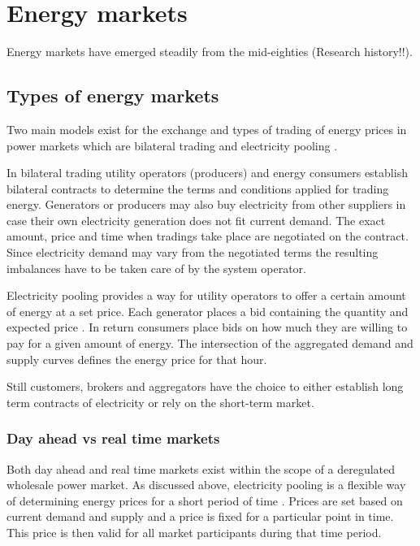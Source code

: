 

\section{Energy markets}

Energy markets have emerged steadily from the mid-eighties (Research history!!). 






\subsection{Types of energy markets}

Two main models exist for the exchange and types of trading of energy prices in power markets which are bilateral trading and electricity pooling \cite{onaiwu2009does,hogan1997reshaping,barroso2005classification}.

In bilateral trading utility operators (producers) and energy consumers establish bilateral contracts to determine the terms and conditions applied for trading energy. Generators or producers may also buy electricity from other suppliers in case their own electricity generation does not fit current demand. The exact amount, price and time when tradings take place are negotiated on the contract. Since electricity demand may vary from the negotiated terms the resulting imbalances have to be taken care of by the system operator. 

Electricity pooling provides a way for utility operators to offer a certain amount of energy at a set price. Each generator places a bid containing the quantity and expected price \cite{barroso2005classification}. In return consumers place bids on how much they are willing to pay for a given amount of energy. The intersection of the aggregated demand and supply curves defines the energy price for that hour. 

Still customers, brokers and aggregators have the choice to either establish long term contracts of electricity or rely on the short-term market. \cite{hogan1997reshaping}


\subsubsection{Day ahead vs real time markets}

Both day ahead and real time markets exist within the scope of a deregulated wholesale power market. As discussed above, electricity pooling is a flexible way of determining energy prices for a short period of time \cite{hogan1997reshaping}. Prices are set based on current demand and supply and a price is fixed for a particular point in time. This price is then valid for all market participants during that time period. 

